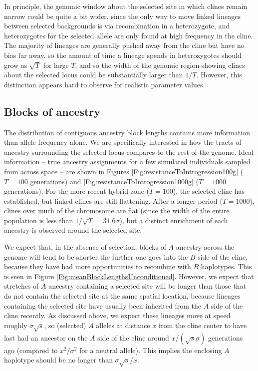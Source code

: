 \documentclass[11pt,letterpaper]{article}
\newcommand{\plr}[1]{{\em \color{blue} #1}}
\begin{document}
In principle, the genomic window about the selected site
in which clines remain narrow could be quite a bit wider,
since the only way to move linked lineages between selected backgrounds is via recombination in a heterozygote,
and heterozygotes for the selected allele are only found at high frequency in the cline.
The majority of lineages are generally pushed away from the cline but have no bias far away,
so the amount of time a lineage spends in heterozygotes should grow as $\sqrt{T}$ for large $T$,
and so the width of the genomic region showing clines about the selected locus could be 
substantially larger than $1/T$. However, this distinction appears hard to observe for realistic parameter values.






\subsection*{Blocks of ancestry}

The distribution of contiguous ancestry block lengths contains more information than allele frequency alone. We are specifically interested in how the tracts of ancestry surrounding the selected locus compares to the rest of the genome. 
Ideal information -- true ancestry assignments for a few simulated individuals sampled from across space -- %
are shown in Figures \ref{Fig:resistanceToIntrogression100g} ($T=100$ generations) and \ref{Fig:resistanceToIntrogression1000g} ($T=1000$ generations).
For the more recent hybrid zone ($T=100$), the selected cline has established,
but linked clines are still flattening.
After a longer period ($T=1000$),
clines over much of the chromosome are flat
(since the width of the entire population is less than $1/\sqrt{T}=31.6\sigma$),
but a distinct enrichment of each ancestry is observed around the selected site.

We expect that, in the absence of selection, blocks of $A$ ancestry across the genome 
will tend to be shorter the further one goes into the $B$ side of the cline,
because they have had more opportunities to recombine with $B$ haplotypes. 
This is seen in Figure \ref{Fig:meanBlockLengthsUnconditioned}.
However, we expect that stretches of $A$ ancestry containing a selected site will be longer
than those that do not contain the selected site at the same spatial location,
because lineages containing the selected site have usually been inherited from the $A$ side of the cline recently. 
As discussed above, we expect these lineages move at speed roughly $\sigma\sqrt{s}$,
so (selected) $A$ alleles at distance $x$ from the cline center
to have last had an ancestor on the $A$ side of the cline around $x/(\sqrt{s}\sigma)$ generations ago 
(compared to $x^2/\sigma^2$ for a neutral allele).
This implies the enclosing $A$ haplotype should be no longer than $\sigma\sqrt{s}/x$.
\end{document}
